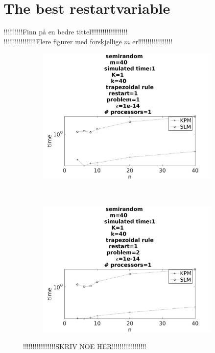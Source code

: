 \section{The best restartvariable}
!!!!!!!!!!Finn på en bedre tittel!!!!!!!!!!!!!!!!!!!\\
!!!!!!!!!!!!!!!!!Flere figurer med forskjellige $m$ er!!!!!!!!!!!!!!!!!!\\
\begin{figure}[H]
        \centering
        \begin{subfigure}[b]{0.45\textwidth}
                \includegraphics[width=\textwidth]{../MATLAB/fig/restarttimeprob1.jpg}
                \caption{  }
                \label{fig:restarttimeprob1}
        \end{subfigure}
        ~
        \begin{subfigure}[b]{0.45\textwidth}
                \includegraphics[width=\textwidth]{../MATLAB/fig/restarttimeprob2.jpg}
                \caption{  }
                \label{fig:restarttimeprob2}
        \end{subfigure}
        \caption{ !!!!!!!!!!!!!!!!!SKRIV NOE HER!!!!!!!!!!!!!!!!!!  }
        \label{fig:restarttimeprob}
\end{figure}


